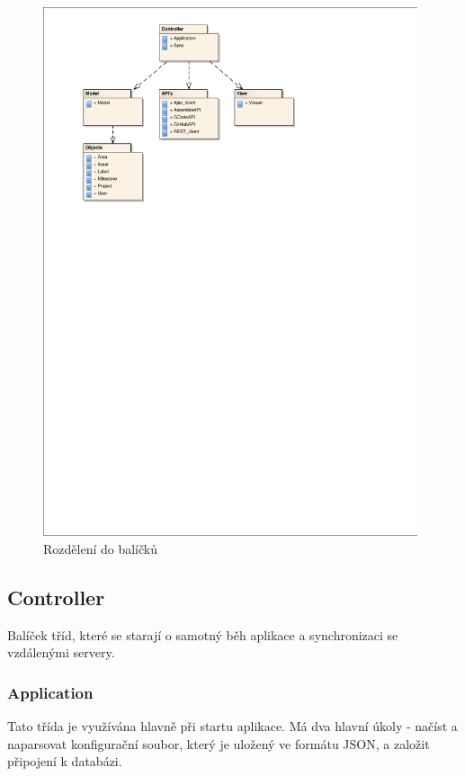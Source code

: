 \begin{figure}[h]
\begin{center}
	\includegraphics[width=11cm,scale=1,trim=20mm 185mm 60mm 10mm, clip]{figures/class-model}
	\caption{Rozdělení do balíčků}
	\label{fig:class-model}
\end{center}
\end{figure}

\subsection{Controller}

Balíček tříd, které se starají o samotný běh aplikace a synchronizaci se vzdálenými servery.

\subsubsection{Application}

Tato třída je využívána hlavně při startu aplikace. Má dva hlavní úkoly - načíst a naparsovat konfigurační soubor, který je uložený ve formátu JSON, a založit připojení k databázi.

